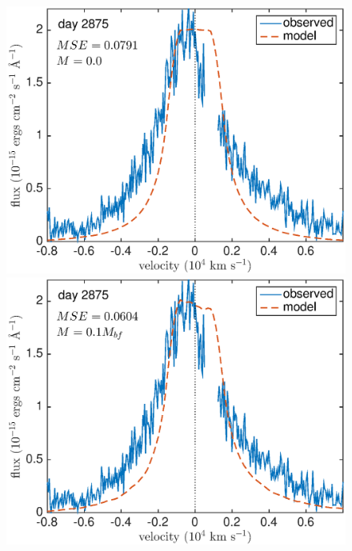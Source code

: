 \begin{figure}
\centering

\includegraphics[clip = true, scale=0.43, trim=10 22 45 0]{chapters/chapter5/images/MSE/d2875_M/d2875_M0}
\includegraphics[clip = true, scale=0.43, trim=42 22 45 0]{chapters/chapter5/images/MSE/d2875_M/d2875_M0_1}


\end{figure}
